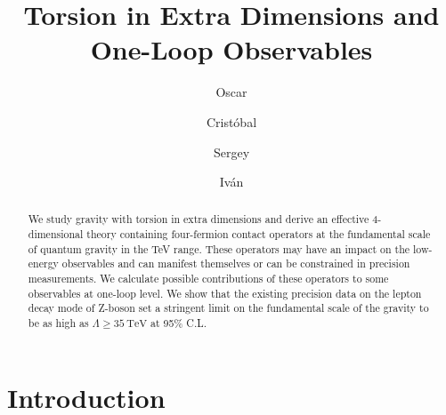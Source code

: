 \documentclass[twocolumn,showpacs,showkeys,prd,superscriptaddress]{revtex4-1}
\begin{document}
\title{Torsion in Extra Dimensions and One-Loop Observables}

\author{Oscar }

\author{Crist\'obal }

\author{Sergey }

\author{Iv\'an }

\begin{abstract}
  We study gravity with torsion in extra dimensions and derive an effective 4-dimensional theory containing four-fermion contact operators at the fundamental scale of quantum gravity in the TeV range. These operators may have an impact on the low-energy observables and can manifest themselves or can be constrained  in precision measurements.  We calculate possible contributions of these operators to some observables at one-loop level. We show that the existing precision data on the lepton decay mode of Z-boson set a stringent limit on the fundamental scale of the gravity to be as high as  $\Lambda\geq \SI{35}{\TeV}$ at 95\% C.L.
\end{abstract}

\maketitle


\section{Introduction}
\end{document}
